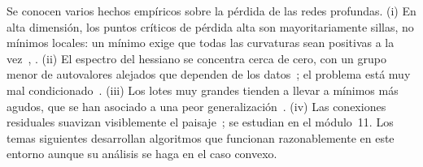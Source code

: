 \begin{observacion}\label{obs:paisaje}
Se conocen varios hechos empíricos sobre la pérdida de las redes profundas. (i) En alta dimensión, los puntos críticos de pérdida alta son mayoritariamente sillas, no mínimos locales: un mínimo exige que todas las curvaturas sean positivas a la vez~\cite{dauphin}, \cite[§8.2.3]{gbc}. (ii) El espectro del hessiano se concentra cerca de cero, con un grupo menor de autovalores alejados que dependen de los datos~\cite{sagun}; el problema está muy mal condicionado~\cite[§8.2.1]{gbc}. (iii) Los lotes muy grandes tienden a llevar a mínimos más agudos, que se han asociado a una peor generalización~\cite{keskar}. (iv) Las conexiones residuales suavizan visiblemente el paisaje~\cite{li-paisaje}; se estudian en el módulo~11. Los temas siguientes desarrollan algoritmos que funcionan razonablemente en este entorno aunque su análisis se haga en el caso convexo.
\end{observacion}

